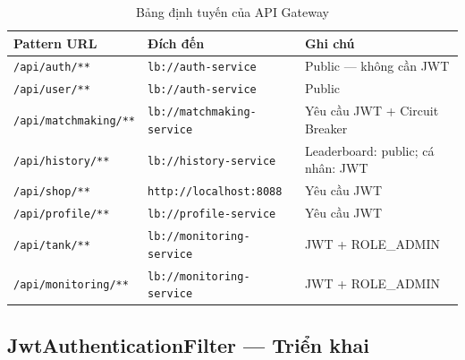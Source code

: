 \documentclass[12pt,a4paper]{report}
\begin{document}
\begin{table}[H]
\centering
\caption{Bảng định tuyến của API Gateway}
\label{tab:routing}
\begin{tabularx}{\textwidth}{llX}
\toprule
\textbf{Pattern URL} & \textbf{Đích đến} & \textbf{Ghi chú} \\
\midrule
\texttt{/api/auth/**}        & \texttt{lb://auth-service}        & Public --- không cần JWT \\
\texttt{/api/user/**}        & \texttt{lb://auth-service}        & Public \\
\texttt{/api/matchmaking/**} & \texttt{lb://matchmaking-service} & Yêu cầu JWT + Circuit Breaker \\
\texttt{/api/history/**}     & \texttt{lb://history-service}     & Leaderboard: public; cá nhân: JWT \\
\texttt{/api/shop/**}        & \texttt{http://localhost:8088}    & Yêu cầu JWT \\
\texttt{/api/profile/**}     & \texttt{lb://profile-service}     & Yêu cầu JWT \\
\texttt{/api/tank/**}        & \texttt{lb://monitoring-service}  & JWT + ROLE\_ADMIN \\
\texttt{/api/monitoring/**}  & \texttt{lb://monitoring-service}  & JWT + ROLE\_ADMIN \\
\bottomrule
\end{tabularx}
\end{table}

\subsection{JwtAuthenticationFilter --- Triển khai}
\end{document}
